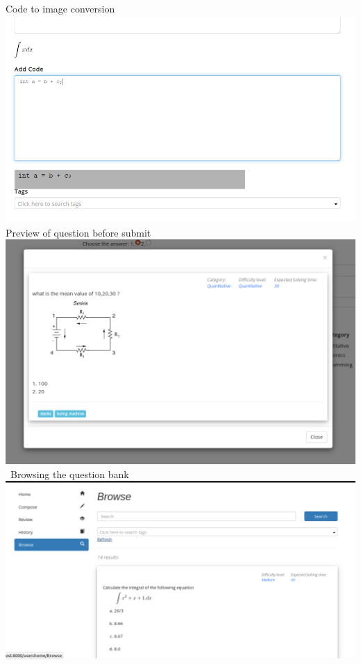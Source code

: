 \documentclass[a4paper,12pt,oneside]{book}
\begin{document}
\vspace{2in}
Code to image conversion \\
\includegraphics[scale=0.45]{compose7.png}	\\

\vspace{0.7in}
Preview of question before submit\\
\includegraphics[scale=0.37]{preview.png}	\\

\
Browsing the question bank\\
\includegraphics[scale=0.3]{browse.png}	\\
\end{document}
